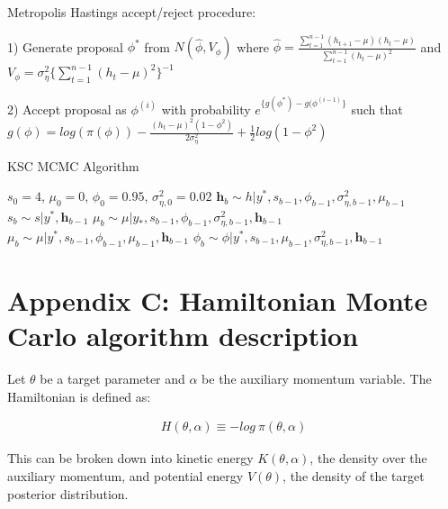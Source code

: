 \documentclass[12pt, a4paper]{article}
\begin{document}
Metropolis Hastings accept/reject procedure:

1) Generate proposal $\phi^\ast$ from $N(\hat{\phi}, V_{\phi})$ where $\hat{\phi} = \frac{\sum_{t=1}^{n-1} (h_{t+1} - \mu)(h_t - \mu)}{\sum_{t=1}^{n-1} (h_t - \mu)^2}$ and $V_{\phi} = \sigma^2_{\eta} \{\sum_{t=1}^{n-1} (h_t - \mu)^2\}^{-1}$

2) Accept proposal as $\phi^{(i)}$ with probability $e^{\{g(\phi^\ast) - g(\phi^{(i-1)}\}}$ such that $g(\phi) = log (\pi (\phi)) - \frac {(h_t - \mu)^2 (1-\phi^2)}{2 \sigma_{\eta}^2} + \frac{1}{2} log (1-\phi^2)$


        \begin{algorithm}[H]
            \caption{KSC MCMC Algorithm}\label{alg:ksc}
            \begin{algorithmic}
            \Require $s_0 = 4$, $\mu_0 = 0$, $\phi_0 = 0.95$, $\sigma^{2}_{\eta,0} = 0.02$
                    \State {} $\boldsymbol{h}_b \sim h|y^{\ast}, s_{b-1}, \phi_{b-1}, \sigma^{2}_{\eta,b-1}, \mu_{b-1}$ 
                    \State {} $s_b \sim s|y^{\ast}, \boldsymbol{h}_{b-1}$
                    \State {} $\mu_b \sim \mu|y_{\ast}, s_{b-1}, \phi_{b-1}, \sigma^{2}_{\eta, b-1}, \boldsymbol{h}_{b-1}$
                    \State {} $\mu_b \sim \mu|y^{\ast}, s_{b-1}, \phi_{b-1}, \mu_{b-1}, \boldsymbol{h}_{b-1}$
                    \State {} $\phi_b \sim \phi|y^{\ast}, s_{b-1}, \mu_{b-1}, \sigma^{2}_{\eta, b-1}, \boldsymbol{h}_{b-1}$
                  \EndFor
            \end{algorithmic}
            \end{algorithm}

\newpage

\section{Appendix C: Hamiltonian Monte Carlo algorithm description}
Let $\theta$ be a target parameter and $\alpha$ be the auxiliary momentum variable. The Hamiltonian is defined as:

$$
\begin{aligned}
H(\theta, \alpha) \equiv - log \: \pi(\theta, \alpha)
\end{aligned}
$$

This can be broken down into kinetic energy $K(\theta, \alpha)$, the density over the auxiliary momentum, and potential energy $V(\theta)$, the density of the target posterior distribution.
\end{document}
